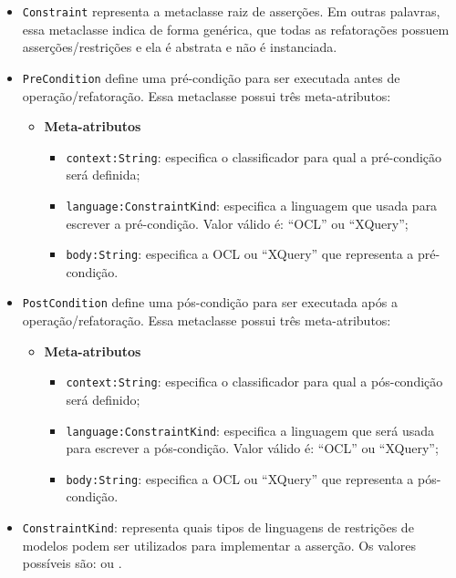 \begin{itemize}
    
    \item \texttt{Constraint} representa a metaclasse raiz de asserções. Em outras palavras, essa metaclasse indica de forma genérica, que todas as refatorações possuem asserções/restrições e ela é abstrata e não é instanciada.
    
    \item \texttt{PreCondition} define uma pré-condição para ser executada antes de operação/refatoração. Essa metaclasse possui três meta-atributos:

\begin{itemize}
	\item \textbf{Meta-atributos}
		\begin{itemize}
			\item \texttt{context:String}: especifica o classificador para qual a pré-condição será definida;
			\item \texttt{language:ConstraintKind}: especifica a linguagem que usada para escrever a pré-condição. Valor válido é: ``OCL'' ou ``XQuery'';
			\item \texttt{body:String}: especifica a OCL ou ``XQuery'' que representa a pré-condição.
		\end{itemize}	
\end{itemize} 

\item \texttt{PostCondition} define uma pós-condição para ser executada após a operação/refatoração. Essa metaclasse possui três meta-atributos:

\begin{itemize}
	\item \textbf{Meta-atributos}
		\begin{itemize}
			\item \texttt{context:String}: especifica o classificador para qual a pós-condição será definido;
			\item \texttt{language:ConstraintKind}: especifica a linguagem que será usada para escrever a pós-condição. Valor válido é: ``OCL'' ou ``XQuery'';
			\item \texttt{body:String}: especifica a OCL ou ``XQuery'' que representa a pós-condição.
		\end{itemize}	
\end{itemize}

\item \texttt{ConstraintKind}: representa quais tipos de linguagens de restrições de modelos podem ser utilizados para implementar a asserção. Os valores possíveis são:  ou .
    
\end{itemize}

